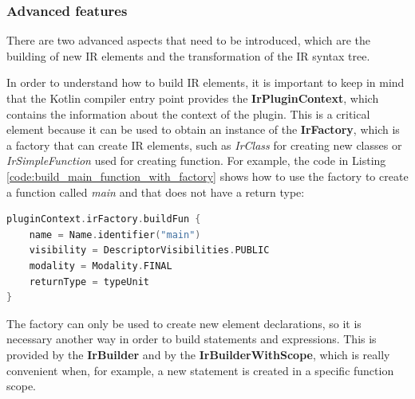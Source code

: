 \subsubsection{Advanced features}\label{section:compiler_plugin_advaced}
There are two advanced aspects that need to be introduced, which are the building of new IR elements and the transformation of the IR syntax tree.

In order to understand how to build IR elements, it is important to keep in mind that the Kotlin compiler entry point provides the \textbf{IrPluginContext}, which contains the information about the context of the plugin. This is a critical element because it can be used to obtain an instance of the \textbf{IrFactory}, which is a factory that can create IR elements, such as \textit{IrClass} for creating new classes or \textit{IrSimpleFunction} used for creating function.\newline
For example, the code in Listing \ref{code:build_main_function_with_factory} shows how to use the factory to create a function called \textit{main} and that does not have a return type:
\begin{lstlisting}[caption={Main function IR building by using the IrFactory \cite{building_koltin_compiler}}, captionpos=b, language=Kotlin, label={code:build_main_function_with_factory}]
pluginContext.irFactory.buildFun {
    name = Name.identifier("main")
    visibility = DescriptorVisibilities.PUBLIC
    modality = Modality.FINAL
    returnType = typeUnit
}        
\end{lstlisting}

The factory can only be used to create new element declarations, so it is necessary another way in order to build statements and expressions. This is provided by the \textbf{IrBuilder} and by the \textbf{IrBuilderWithScope}, which is really convenient when, for example, a new statement is created in a specific function scope.

